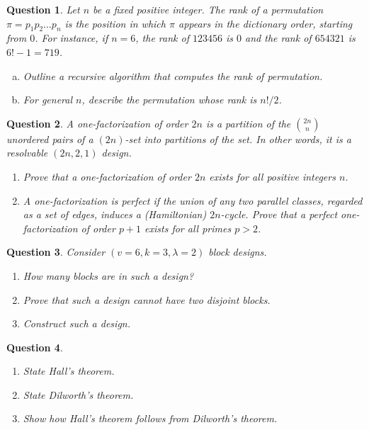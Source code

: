 \documentclass[12]{article}
\newtheorem{question}{Question}
\theoremstyle{definition}
\begin{document}
	\begin{question}
		Let $n$ be a fixed positive integer.  The rank of a permutation $\pi = p_1p_2\ldots p_n$ is the position in which $\pi$ appears in the dictionary order, starting from $0$.  For instance, if $n=6$, the rank of $123456$ is $0$ and the rank of $654321$ is $6!-1 = 719$.
		\begin{enumerate}[a)]
			\item Outline a recursive algorithm that computes the rank of permutation.
			\item For general $n$, describe the permutation whose rank is $n!/2$.
		\end{enumerate}
	\end{question}

	\begin{question}
		A one-factorization of order $2n$ is a partition of the ${2n \choose n}$ unordered pairs of a $(2n)$-set into partitions of the set.  In other words, it is a resolvable $(2n,2,1)$ design.
		\begin{enumerate}
			\item Prove that a one-factorization of order $2n$ exists for all positive integers $n$.
			\item A one-factorization is perfect if the union of any two parallel classes, regarded as a set of edges, induces a (Hamiltonian) $2n$-cycle.  Prove that a perfect one-factorization of order $p+1$ exists for all primes $p > 2$.
		\end{enumerate}
	\end{question}

	\begin{question}
		Consider $(v=6,k=3,\lambda=2)$ block designs.
		\begin{enumerate}
			\item How many blocks are in such a design?
			\item Prove that such a design cannot have two disjoint blocks.
			\item Construct such a design.
		\end{enumerate}
	\end{question}

	\begin{question}
		\
		\begin{enumerate}
			\item State Hall's theorem.
			\item State Dilworth's theorem.
			\item Show how Hall's theorem follows from Dilworth's theorem.
		\end{enumerate}
	\end{question}
\end{document}
